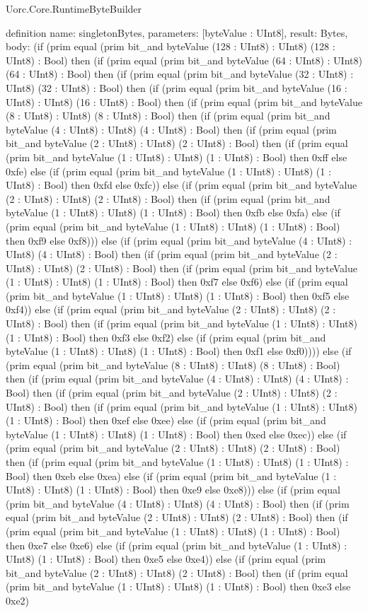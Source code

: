 \begin{lexlean}{Uorc.Core.RuntimeByteBuilder}
\begin{semanticmodule}
definition{
  name: singletonBytes,
  parameters: [byteValue : UInt8],
  result: Bytes,
  body: (if (prim equal (prim bit_and byteValue (128 : UInt8) : UInt8) (128 : UInt8) : Bool) then (if (prim equal (prim bit_and byteValue (64 : UInt8) : UInt8) (64 : UInt8) : Bool) then (if (prim equal (prim bit_and byteValue (32 : UInt8) : UInt8) (32 : UInt8) : Bool) then (if (prim equal (prim bit_and byteValue (16 : UInt8) : UInt8) (16 : UInt8) : Bool) then (if (prim equal (prim bit_and byteValue (8 : UInt8) : UInt8) (8 : UInt8) : Bool) then (if (prim equal (prim bit_and byteValue (4 : UInt8) : UInt8) (4 : UInt8) : Bool) then (if (prim equal (prim bit_and byteValue (2 : UInt8) : UInt8) (2 : UInt8) : Bool) then (if (prim equal (prim bit_and byteValue (1 : UInt8) : UInt8) (1 : UInt8) : Bool) then 0xff else 0xfe) else (if (prim equal (prim bit_and byteValue (1 : UInt8) : UInt8) (1 : UInt8) : Bool) then 0xfd else 0xfc)) else (if (prim equal (prim bit_and byteValue (2 : UInt8) : UInt8) (2 : UInt8) : Bool) then (if (prim equal (prim bit_and byteValue (1 : UInt8) : UInt8) (1 : UInt8) : Bool) then 0xfb else 0xfa) else (if (prim equal (prim bit_and byteValue (1 : UInt8) : UInt8) (1 : UInt8) : Bool) then 0xf9 else 0xf8))) else (if (prim equal (prim bit_and byteValue (4 : UInt8) : UInt8) (4 : UInt8) : Bool) then (if (prim equal (prim bit_and byteValue (2 : UInt8) : UInt8) (2 : UInt8) : Bool) then (if (prim equal (prim bit_and byteValue (1 : UInt8) : UInt8) (1 : UInt8) : Bool) then 0xf7 else 0xf6) else (if (prim equal (prim bit_and byteValue (1 : UInt8) : UInt8) (1 : UInt8) : Bool) then 0xf5 else 0xf4)) else (if (prim equal (prim bit_and byteValue (2 : UInt8) : UInt8) (2 : UInt8) : Bool) then (if (prim equal (prim bit_and byteValue (1 : UInt8) : UInt8) (1 : UInt8) : Bool) then 0xf3 else 0xf2) else (if (prim equal (prim bit_and byteValue (1 : UInt8) : UInt8) (1 : UInt8) : Bool) then 0xf1 else 0xf0)))) else (if (prim equal (prim bit_and byteValue (8 : UInt8) : UInt8) (8 : UInt8) : Bool) then (if (prim equal (prim bit_and byteValue (4 : UInt8) : UInt8) (4 : UInt8) : Bool) then (if (prim equal (prim bit_and byteValue (2 : UInt8) : UInt8) (2 : UInt8) : Bool) then (if (prim equal (prim bit_and byteValue (1 : UInt8) : UInt8) (1 : UInt8) : Bool) then 0xef else 0xee) else (if (prim equal (prim bit_and byteValue (1 : UInt8) : UInt8) (1 : UInt8) : Bool) then 0xed else 0xec)) else (if (prim equal (prim bit_and byteValue (2 : UInt8) : UInt8) (2 : UInt8) : Bool) then (if (prim equal (prim bit_and byteValue (1 : UInt8) : UInt8) (1 : UInt8) : Bool) then 0xeb else 0xea) else (if (prim equal (prim bit_and byteValue (1 : UInt8) : UInt8) (1 : UInt8) : Bool) then 0xe9 else 0xe8))) else (if (prim equal (prim bit_and byteValue (4 : UInt8) : UInt8) (4 : UInt8) : Bool) then (if (prim equal (prim bit_and byteValue (2 : UInt8) : UInt8) (2 : UInt8) : Bool) then (if (prim equal (prim bit_and byteValue (1 : UInt8) : UInt8) (1 : UInt8) : Bool) then 0xe7 else 0xe6) else (if (prim equal (prim bit_and byteValue (1 : UInt8) : UInt8) (1 : UInt8) : Bool) then 0xe5 else 0xe4)) else (if (prim equal (prim bit_and byteValue (2 : UInt8) : UInt8) (2 : UInt8) : Bool) then (if (prim equal (prim bit_and byteValue (1 : UInt8) : UInt8) (1 : UInt8) : Bool) then 0xe3 else 0xe2) }
\end{semanticmodule}
\end{lexlean}
